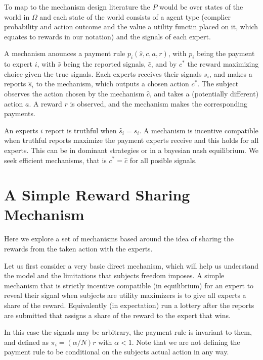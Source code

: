 To map to the mechanism design literature the $P$ would be over states of the world in $\Omega$ and each state of the world consists of a agent type (complier probability and action outcome and the value a utility functin placed on it, which equates to rewards in our notation) and the signals of each expert.

A mechanism anounces a payment rule $p_i(\hat{s}, c,a,r)$, with $p_i$ being the payment to expert $i$, with $\hat{s}$ being the reported signals, $\hat{c}$, and by $c^{*}$ the reward maximizing choice given the true signals.
Each experts receives their signals $s_i$, and makes a reports $\hat{s}_i$ to the mechanism, which outputs a chosen action $c^{*}$.
The subject observes the action chosen by the mechanism $\hat{c}$, and takes a (potentially different) action $a$. A reward $r$ is observed, and the mechanism makes the corresponding payments.

An experts $i$ report is truthful when $\hat{s}_i=s_i$. A mechanism is incentive compatible when truthful reports maximize the payment experts receive and this holds for all experts. This can be in dominant strategies or in a bayesian nash equilibrium.  We seek efficient mechanisms, that is $c^{*} = \hat{c}$ for all posible signals.



\section{A Simple Reward Sharing Mechanism}

Here we explore a set of mechanisms based around the idea of sharing the rewards from the taken action with the experts.

Let us first consider a very basic direct mechanism, which will help us understand the model and the limitations that subjects freedom imposes. 
A simple mechanism that is strictly incentive compatible (in equilibrium) for an expert to reveal their signal when subjects are utility maximizers is to give all experts a share of the reward. Equivalently (in expectation) run a lottery after the reports are submitted that assigns a share of the reward to the expert that wins. 

In this case the signals may be arbitrary, the payment rule is invariant to them, and defined as $\pi_i  = (\alpha / N ) r $ with $\alpha < 1$. Note that we are not defining the payment rule to be conditional on the subjects actual action in any way. %



